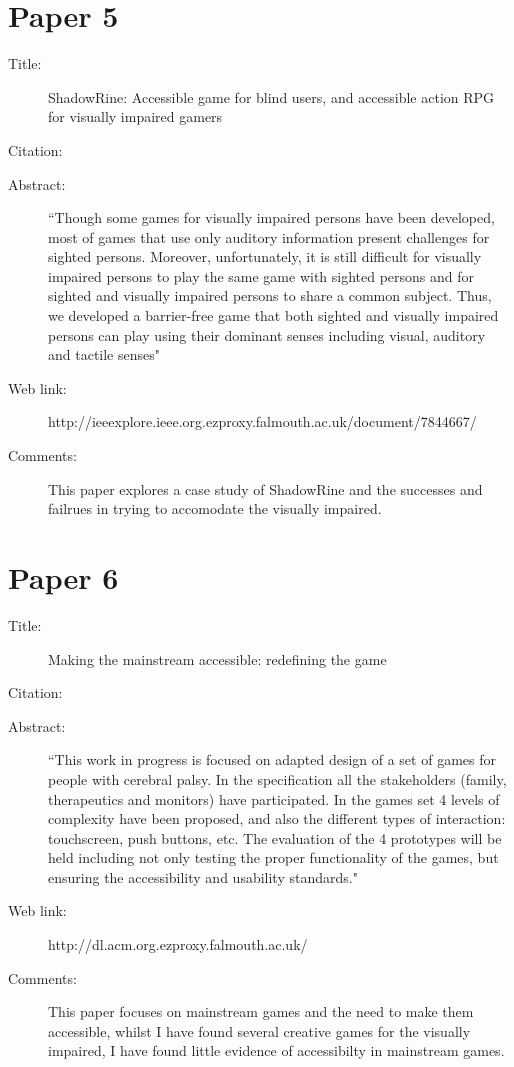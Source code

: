 \documentclass{scrartcl}
\begin{document}
\section*{Paper 5}
\begin{description}
\item[Title:] ShadowRine: Accessible game for blind users, and accessible action RPG for visually impaired gamers
\item[Citation:] \cite{Matsuo}
\item[Abstract:] ``Though some games for visually impaired persons have been developed, most of games that use only auditory information present challenges for sighted persons. Moreover, unfortunately, it is still difficult for visually impaired persons to play the same game with sighted persons and for sighted and visually impaired persons to share a common subject. Thus, we developed a barrier-free game that both sighted and visually impaired persons can play using their dominant senses including visual, auditory and tactile senses"
\item[Web link:] http://ieeexplore.ieee.org.ezproxy.falmouth.ac.uk/document/7844667/
\item[Comments:] This paper explores a case study of ShadowRine and the successes and failrues in trying to accomodate the visually impaired.
\end{description}

\section*{Paper 6}
\begin{description}
\item[Title:] Making the mainstream accessible: redefining the game
\item[Citation:] \cite{Atkinson}
\item[Abstract:] ``This work in progress is focused on adapted design of a set of games for people with cerebral palsy. In the specification all the stakeholders (family, therapeutics and monitors) have participated. In the games set 4 levels of complexity have been proposed, and also the different types of interaction: touchscreen, push buttons, etc. The evaluation of the 4 prototypes will be held including not only testing the proper functionality of the games, but ensuring the accessibility and usability standards."
\item[Web link:] http://dl.acm.org.ezproxy.falmouth.ac.uk/
\item[Comments:] This paper focuses on mainstream games and the need to make them accessible, whilst I have found several creative games for the visually impaired, I have found little evidence of accessibilty in mainstream games.
\end{description}
\end{document}
